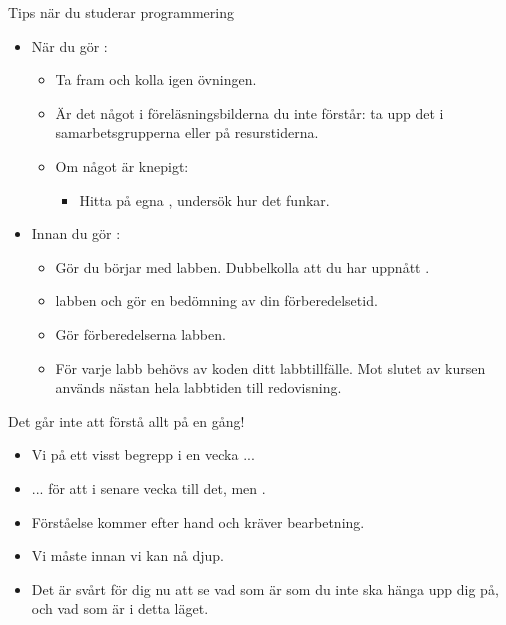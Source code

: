 \begin{SlideExtra}{Tips när du studerar programmering}
\SlideFontSmall
  \begin{itemize}\SlideFontSmall
\item När du gör :
\begin{itemize}\SlideFontSmall
\item Ta fram  och kolla igen  övningen.
\item Är det något i föreläsningsbilderna du inte förstår: ta upp det i samarbetsgrupperna eller på resurstiderna.
\item Om något är knepigt:
\begin{itemize}\SlideFontSmall
\item Hitta på egna , undersök hur det funkar.
\end{itemize}
\end{itemize}

\item Innan du gör :
\begin{itemize}\SlideFontSmall
\item Gör   du börjar med labben. Dubbelkolla att du har uppnått .
\item {}    labben och gör en bedömning av din förberedelsetid.
\item Gör förberedelserna  labben.
\item För varje labb behövs  av koden  ditt labbtillfälle. Mot slutet av kursen används nästan hela labbtiden till redovisning.
\end{itemize}
\end{itemize}

\end{SlideExtra}

\begin{SlideExtra}{Det går inte att förstå allt på en gång!}
\begin{itemize}
\item Vi  på ett visst begrepp  i en vecka ...

\item ... för att i senare vecka  till det, men .

\item Förståelse kommer efter hand och kräver bearbetning.

\item Vi måste  innan vi kan nå djup.

\item Det är svårt för dig nu att se vad som är  som du inte ska hänga upp dig på, och vad som är  i detta läget.  
\end{itemize}

\end{SlideExtra}


